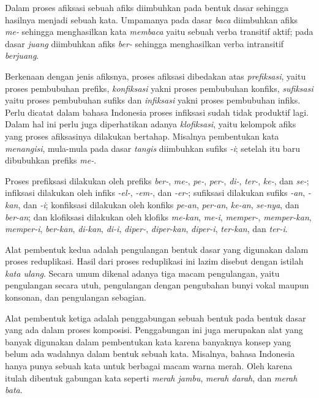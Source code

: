 Dalam proses afiksasi sebuah afiks diimbuhkan pada bentuk dasar sehingga hasilnya menjadi sebuah kata. Umpamanya pada dasar \textit{baca} diimbuhkan afiks \textit{me-} sehingga menghasilkan kata \textit{membaca} yaitu sebuah verba transitif aktif; pada dasar \textit{juang} diimbuhkan afiks \textit{ber-} sehingga menghasilkan verba intransitif \textit{berjuang}.

Berkenaan dengan jenis afiksnya, proses afiksasi dibedakan atas \textit{prefiksasi}, yaitu proses pembubuhan prefiks, \textit{konfiksasi} yakni proses pembubuhan konfiks, \textit{sufiksasi} yaitu proses pembubuhan sufiks dan \textit{infiksasi} yakni proses pembubuhan infiks. Perlu dicatat dalam bahasa Indonesia proses infiksasi sudah tidak produktif lagi. Dalam hal ini perlu juga diperhatikan adanya \textit{klofiksasi}, yaitu kelompok afiks yang proses afiksasinya dilakukan bertahap. Misalnya pembentukan kata \textit{menangisi}, mula-mula pada dasar \textit{tangis} diimbuhkan sufiks \textit{-i}; setelah itu baru dibubuhkan prefiks \textit{me-}.

Proses prefiksasi dilakukan oleh prefiks \textit{ber-}, \textit{me-}, \textit{pe-}, \textit{per-}, \textit{di-}, \textit{ter-}, \textit{ke-}, dan \textit{se-}; infiksasi dilakukan oleh infiks \textit{-el-}, \textit{-em-}, dan \textit{-er-}; sufiksasi dilakukan sufiks \textit{-an}, \textit{-kan}, dan \textit{-i}; konfiksasi dilakukan oleh konfiks \textit{pe-an}, \textit{per-an}, \textit{ke-an}, \textit{se-nya}, dan \textit{ber-an}; dan klofiksasi dilakukan oleh klofiks \textit{me-kan}, \textit{me-i}, \textit{memper-}, \textit{memper-kan}, \textit{memper-i}, \textit{ber-kan}, \textit{di-kan}, \textit{di-i}, \textit{diper-}, \textit{diper-kan}, \textit{diper-i}, \textit{ter-kan}, dan \textit{ter-i}.


Alat pembentuk kedua adalah pengulangan bentuk dasar yang digunakan dalam proses reduplikasi. Hasil dari proses reduplikasi ini lazim disebut dengan istilah \textit{kata ulang}. Secara umum dikenal adanya tiga macam pengulangan, yaitu pengulangan secara utuh, pengulangan dengan pengubahan bunyi vokal maupun konsonan, dan pengulangan sebagian.

Alat pembentuk ketiga adalah penggabungan sebuah bentuk pada bentuk dasar yang ada dalam proses komposisi. Penggabungan ini juga merupakan alat yang banyak digunakan dalam pembentukan kata karena banyaknya konsep yang belum ada wadahnya dalam bentuk sebuah kata. Misalnya, bahasa Indonesia hanya punya sebuah kata untuk berbagai macam warna merah. Oleh karena itulah dibentuk gabungan kata seperti \textit{merah jambu}, \textit{merah darah}, dan \textit{merah bata}.

